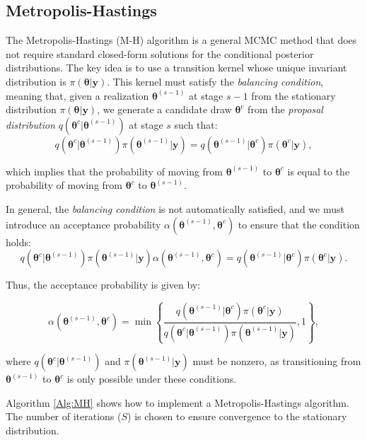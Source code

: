 \subsection{Metropolis-Hastings}\label{sec512}

The Metropolis-Hastings (M-H) algorithm \cite{metropolis53,hastings70} is a general MCMC method that does not require standard closed-form solutions for the conditional posterior distributions. The key idea is to use a transition kernel whose unique invariant distribution is $\pi(\bm{\theta} | \bm{y})$. This kernel must satisfy the \textit{balancing condition}, meaning that, given a realization $\bm{\theta}^{(s-1)}$ at stage $s-1$ from the stationary distribution $\pi(\bm{\theta} | \bm{y})$, we generate a candidate draw $\bm{\theta}^{c}$ from the \textit{proposal distribution} $q(\bm{\theta}^{c} | \bm{\theta}^{(s-1)})$ at stage $s$ such that:
\[
q(\bm{\theta}^{c} | \bm{\theta}^{(s-1)}) \pi(\bm{\theta}^{(s-1)} | \bm{y}) = q(\bm{\theta}^{(s-1)} | \bm{\theta}^{c}) \pi(\bm{\theta}^{c} | \bm{y}),
\]

which implies that the probability of moving from $\bm{\theta}^{(s-1)}$ to $\bm{\theta}^{c}$ is equal to the probability of moving from $\bm{\theta}^{c}$ to $\bm{\theta}^{(s-1)}$.

In general, the \textit{balancing condition} is not automatically satisfied, and we must introduce an acceptance probability $\alpha(\bm{\theta}^{(s-1)}, \bm{\theta}^{c})$ to ensure that the condition holds:
\[
q(\bm{\theta}^{c} | \bm{\theta}^{(s-1)}) \pi(\bm{\theta}^{(s-1)} | \bm{y}) \alpha(\bm{\theta}^{(s-1)}, \bm{\theta}^{c}) = q(\bm{\theta}^{(s-1)} | \bm{\theta}^{c}) \pi(\bm{\theta}^{c} | \bm{y}).
\]

Thus, the acceptance probability is given by:

\[
\alpha(\bm{\theta}^{(s-1)}, \bm{\theta}^{c}) = 
\min\left\{\frac{q(\bm{\theta}^{(s-1)} | \bm{\theta}^{c}) \pi(\bm{\theta}^{c} | \bm{y})}{q(\bm{\theta}^{c} | \bm{\theta}^{(s-1)}) \pi(\bm{\theta}^{(s-1)} | \bm{y})}, 1\right\},
\]

where $q(\bm{\theta}^{c} | \bm{\theta}^{(s-1)})$ and $\pi(\bm{\theta}^{(s-1)} | \bm{y})$ must be nonzero, as transitioning from $\bm{\theta}^{(s-1)}$ to $\bm{\theta}^{c}$ is only possible under these conditions.

Algorithm \ref{Alg:MH} shows how to implement a Metropolis-Hastings algorithm.  The number of iterations ($S$) is chosen to ensure convergence to the stationary distribution. 

